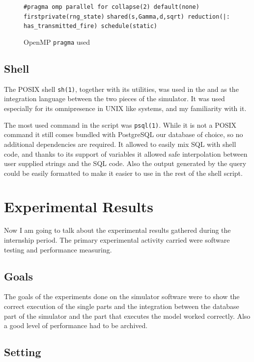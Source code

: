 \documentclass[Lau]{sapthesis} %
\let\oldsection\section
\def\subsection{\oldsection}
\def\section{\chapter}
\begin{document}
\begin{figure}
\centering
\footnotesize
\verb+#pragma omp parallel for collapse(2) default(none) firstprivate(rng_state)+
\verb+shared(s,Gamma,d,sqrt) reduction(|: has_transmitted_fire) schedule(static)+
\caption{OpenMP \texttt{pragma} used}
\label{fig:pragma}
\end{figure}

\subsection{Shell}

The POSIX shell \texttt{sh(1)}, together with its utilities, was used in the and
as the integration language between the two pieces of the simulator. It was used
especially for its omnipresence in UNIX like systems, and my familiarity with
it.

The most used command in the script was \texttt{psql(1)}. While it is not a
POSIX command it still comes bundled with PostgreSQL our database of choice, so
no additional dependencies are required. It allowed to easily mix SQL with shell
code, and thanks to its support of variables it allowed safe interpolation
between user supplied strings and the SQL code. Also the output generated by the
query could be easily formatted to make it easier to use in the rest of the
shell script.

\section{Experimental Results}%

Now I am going to talk about the experimental results gathered during the
internship period. The primary experimental activity carried were software
testing and performance measuring.

\subsection{Goals}

The goals of the experiments done on the simulator software were to show the
correct execution of the single parts and the integration between the
database part of the simulator and the part that executes the model worked
correctly. Also a good level of performance had to be archived.

\subsection{Setting}
\end{document}
